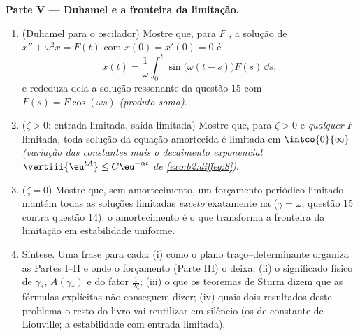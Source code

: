 \begin{problem}
\medskip
\noindent\textbf{Parte V --- Duhamel e a fronteira da
limitação.}
\begin{enumerate}[resume]
  \item (Duhamel para o oscilador) Mostre que, para $F$
        , a solução de $x'' + \omega^2x =
        F(t)$ com $x(0) = x'(0) = 0$ é
        \[
        x(t) = \frac1\omega\int_0^t\sin\bigl(\omega(t -
        s)\bigr)F(s)\,\dd s ,
        \]
        e rededuza dela a solução ressonante da questão 15
        com $F(s) = F\cos(\omega s)$
        \emph{(produto-soma)}.
  \item ($\zeta > 0$: entrada limitada, saída limitada) Mostre
        que, para $\zeta > 0$ e \emph{qualquer} $F$ 
        limitada, toda solução da equação amortecida é limitada
        em $\intco{0}{\infty}$ \emph{(variação das constantes
        mais o decaimento exponencial $\vertiii{\eu^{tA}} \leq
        C\eu^{-\alpha t}$ de \cref{exo:b2:diffeq:8})}.
  \item ($\zeta = 0$) Mostre que, sem amortecimento, um forçamento
        periódico limitado mantém todas as soluções limitadas
        \emph{exceto} exatamente na  ($\gamma =
        \omega$, questão 15 contra questão 14): o amortecimento é
        o que transforma a fronteira da limitação em estabilidade
        uniforme.
  \item Síntese. Uma frase para cada: (i) como o
        plano traço--determinante organiza as Partes I--II e
        onde o forçamento (Parte III) o deixa; (ii) o
        significado físico de $\gamma_*$, $A(\gamma_*)$ e do
        fator $\frac1{2\zeta}$; (iii) o que os teoremas de Sturm
        dizem que as fórmulas explícitas não conseguem dizer; (iv)
        quais dois resultados deste problema o resto do
        livro vai reutilizar em silêncio (os  de
        constante de Liouville; a estabilidade com entrada limitada).
\end{enumerate}
\end{problem}
